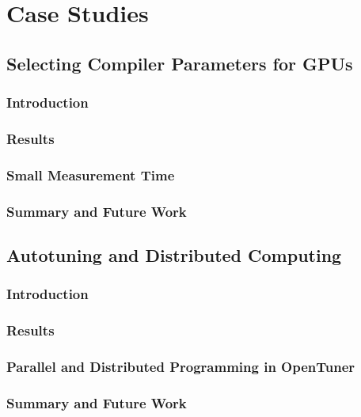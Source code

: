 \chapter{Case Studies}
\label{chap:usecases}

\section{Selecting Compiler Parameters for GPUs}
\label{sec:paramSelGPU}

\subsection{Introduction}
\label{subsec:GPUintro}

\subsection{Results}
\label{subsec:GPUres}

\subsection{Small Measurement Time}
\label{subsec:smalltime}

\subsection{Summary and Future Work}
\label{subsec:GPUconcl}

\section{Autotuning and Distributed Computing}
\label{sec:autotuningCloud}

\subsection{Introduction}
\label{subsec:CLintro}

\subsection{Results}
\label{subsec:CLres}

\subsection{Parallel and Distributed Programming in OpenTuner}
\label{subsec:parallel}

\subsection{Summary and Future Work}
\label{subsec:CLconcl}

